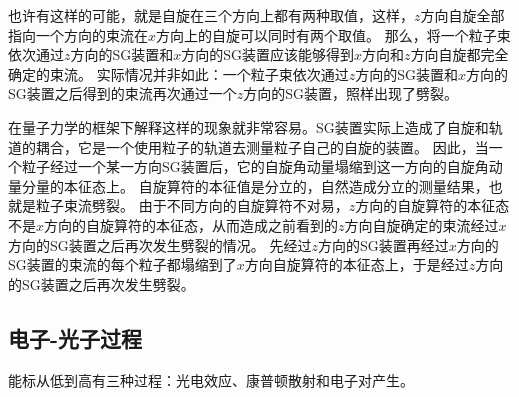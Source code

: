 \documentclass[UTF8, a4paper]{ctexart}
\begin{document}
也许有这样的可能，就是自旋在三个方向上都有两种取值，这样，$z$方向自旋全部指向一个方向的束流在$x$方向上的自旋可以同时有两个取值。
那么，将一个粒子束依次通过$z$方向的SG装置和$x$方向的SG装置应该能够得到$x$方向和$z$方向自旋都完全确定的束流。
实际情况并非如此：一个粒子束依次通过$z$方向的SG装置和$x$方向的SG装置之后得到的束流再次通过一个$z$方向的SG装置，照样出现了劈裂。

在量子力学的框架下解释这样的现象就非常容易。SG装置实际上造成了自旋和轨道的耦合，它是一个使用粒子的轨道去测量粒子自己的自旋的装置。
因此，当一个粒子经过一个某一方向SG装置后，它的自旋角动量塌缩到这一方向的自旋角动量分量的本征态上。
自旋算符的本征值是分立的，自然造成分立的测量结果，也就是粒子束流劈裂。
由于不同方向的自旋算符不对易，$z$方向的自旋算符的本征态不是$x$方向的自旋算符的本征态，从而造成之前看到的$z$方向自旋确定的束流经过$x$方向的SG装置之后再次发生劈裂的情况。
先经过$z$方向的SG装置再经过$x$方向的SG装置的束流的每个粒子都塌缩到了$x$方向自旋算符的本征态上，于是经过$z$方向的SG装置之后再次发生劈裂。

\subsection{电子-光子过程}

能标从低到高有三种过程：光电效应、康普顿散射和电子对产生。
\end{document}
